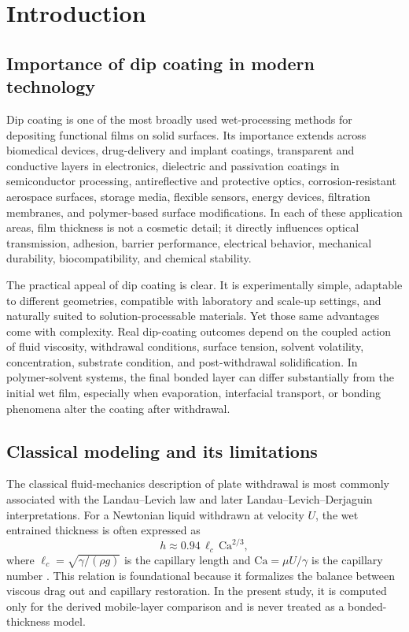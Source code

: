 \documentclass[11pt]{article}
\begin{document}
\section{Introduction}

\subsection{Importance of dip coating in modern technology}
Dip coating is one of the most broadly used wet-processing methods for depositing functional films on solid surfaces. Its importance extends across biomedical devices, drug-delivery and implant coatings, transparent and conductive layers in electronics, dielectric and passivation coatings in semiconductor processing, antireflective and protective optics, corrosion-resistant aerospace surfaces, storage media, flexible sensors, energy devices, filtration membranes, and polymer-based surface modifications. In each of these application areas, film thickness is not a cosmetic detail; it directly influences optical transmission, adhesion, barrier performance, electrical behavior, mechanical durability, biocompatibility, and chemical stability.

The practical appeal of dip coating is clear. It is experimentally simple, adaptable to different geometries, compatible with laboratory and scale-up settings, and naturally suited to solution-processable materials. Yet those same advantages come with complexity. Real dip-coating outcomes depend on the coupled action of fluid viscosity, withdrawal conditions, surface tension, solvent volatility, concentration, substrate condition, and post-withdrawal solidification. In polymer-solvent systems, the final bonded layer can differ substantially from the initial wet film, especially when evaporation, interfacial transport, or bonding phenomena alter the coating after withdrawal.

\subsection{Classical modeling and its limitations}
The classical fluid-mechanics description of plate withdrawal is most commonly associated with the Landau--Levich law and later Landau--Levich--Derjaguin interpretations. For a Newtonian liquid withdrawn at velocity $U$, the wet entrained thickness is often expressed as
\begin{equation}
h \approx 0.94 \, \ell_c \, \mathrm{Ca}^{2/3},
\end{equation}
where $\ell_c = \sqrt{\gamma/(\rho g)}$ is the capillary length and $\mathrm{Ca} = \mu U/\gamma$ is the capillary number \cite{landau1942,rio2017}. This relation is foundational because it formalizes the balance between viscous drag out and capillary restoration. In the present study, it is computed only for the derived mobile-layer comparison and is never treated as a bonded-thickness model.
\end{document}
